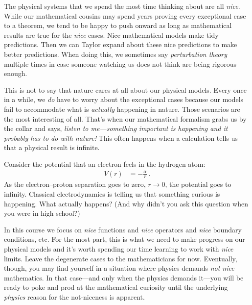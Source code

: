 The physical systems that we spend the most time thinking about are all \emph{nice}. 
%
While our mathematical cousins may spend years proving every exceptional case to a theorem, we tend to be happy to push onward as long as mathematical results are true for the \emph{nice} cases. 
%
Nice mathematical models make tidy predictions. Then we can Taylor expand about these nice predictions to make better predictions.
%
When doing this, we sometimes say \emph{perturbation theory} multiple times in case someone watching us does not think are being rigorous enough.
% 
%

This is not to say that nature cares at all about our physical models. 
%
Every once in a while, we \emph{do} have to worry about the exceptional cases because our models fail to accommodate what is \emph{actually} happening in nature. Those scenarios are the most interesting of all. That’s when our mathematical formalism grabs us by the collar and says, \emph{listen to me---something important is happening and it probably has to do with nature!} This often happens when a calculation tells us that a physical result is infinite. 

\begin{exercise}
Consider the potential that an electron feels in the hydrogen atom:
\begin{align}
	V(r) &= -\frac{\alpha}{r} \ .
\end{align}
As the electron--proton separation goes to zero, $r\to 0$, the potential goes to infinity. Classical electrodynamics is telling us that something curious is happening. What actually happens? (And why didn't you ask this question when you were in high school?)
\end{exercise}

In this course we focus on \emph{nice} functions and \emph{nice} operators and \emph{nice} boundary conditions, etc. For the most part, this is what we need to make progress on our physical models and it’s worth spending our time learning to work with \emph{nice} limits. Leave the degenerate cases to the mathematicians for now. Eventually, though, you may find yourself in a situation where physics demands \emph{not nice} mathematics. In that case---and only when the physics demands it---you will be ready to poke and prod at the mathematical curiosity until the underlying \emph{physics} reason for the not-niceness is apparent.

